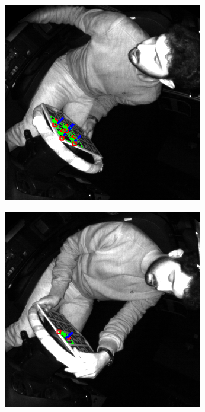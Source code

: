 \begin{figure}[ht]
\begin{subfigure}[t]{0.23\textwidth}
    \end{subfigure}\hfill
    \begin{subfigure}[t]{0.23\textwidth}
        \centering
        \includegraphics[width=\textwidth]{media/chapter 5/aruco_board_estimation2.png}
    \end{subfigure}\hfill
    \begin{subfigure}[t]{0.23\textwidth}
        \centering
        \includegraphics[width=\textwidth]{media/chapter 5/aruco_board_estimation3.png}

\end{subfigure}
\end{figure}
